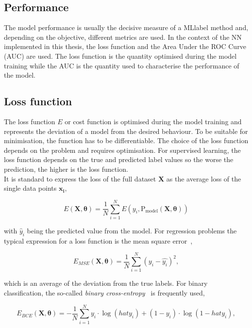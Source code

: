 \subsection{Performance}

The model performance is usually the decisive measure of a \acrshort{MLlabel} method and, depending on the objective, different metrics are used. In the context of the NN implemented in this thesis, the loss function and the Area Under the ROC Curve (AUC) are used. The loss function is the quantity optimised during the model training while the AUC is the quantity used to characterise the performance of the model.

\subsection{Loss function}

The loss function $E$ or cost function is optimised during the model training and represents the deviation of a model from the desired behaviour. To be suitable for minimisation, the function has to be differentiable. The choice of the loss function depends on the problem and requires optimisation. For supervised learning, the loss function depends on the true and predicted label values so the worse the prediction, the higher is the loss function.\\

It is standard to express the loss of the full dataset $\mathbf{X}$ as the average loss of the single data points $\mathbf{x_i}$,

\begin{equation}
    E(\mathbf{X},\boldsymbol{\theta})=\frac{1}{N}\sum_{i=1}^NE(y_i,\text{P}_\text{model}(\mathbf{X},\boldsymbol{\theta}))
\end{equation}

with $\hat{y}_i$ being the predicted value from the model. For regression problems the typical expression for a loss function is the mean square error~\cite{EncyclopediaofML}, 

\begin{equation}
    E_{MSE}(\mathbf{X},\boldsymbol{\theta}) = \frac{1}{N}\sum_{i=1}^N (y_i-\hat{y_i})^2,
\end{equation}

which is an average of the deviation from the true labels. For binary classification, the so-called \textit{binary cross-entropy}~\cite{binarycross} is frequently used, 

\begin{equation}
    E_{BCE}(\mathbf{X},\boldsymbol{\theta}) = -\frac{1}{N}\sum_{i=1}^N y_i\cdot\log(hat{y_i})+(1-y_i)\cdot\log(1-hat{y_i}),
\end{equation}

